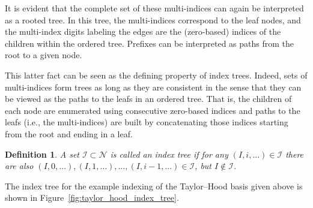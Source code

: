 \documentclass[a4paper,10pt,headings=normal,bibliography=totoc]{scrartcl}
\newtheorem{definition}{Definition}
\begin{document}
It is evident that the complete set of these multi-indices can again be interpreted as a rooted tree.
In this tree, the multi-indices correspond
to the leaf nodes, and the multi-index digits labeling the edges are the
(zero-based) indices of the children within the ordered tree.  Prefixes can be
interpreted as paths from the root to a given node.

This latter fact can be seen as the defining property of index trees.  Indeed,
sets of multi-indices form trees as long as they are consistent in the sense that they
can be viewed as the paths to the leafs in an ordered tree.
That is, the children of each node are enumerated using consecutive zero-based
indices and paths to the leafs (i.e., the multi-indices) are built by concatenating
those indices starting from the root and ending in a leaf.

\begin{definition}
\label{def:index_tree}
 A set $\mathcal{I} \subset \mathcal{N}$ is called an \emph{index tree}
 if for any $(I,i,\dots) \in \mathcal{I}$ there are also $(I,0,\dots),(I,1,\dots),\dots,(I,i-1,\dots) \in \mathcal{I}$,
 but $I \notin \mathcal{I}$.
\end{definition}
The index tree for the example indexing of the Taylor--Hood basis given above is shown
in Figure~\ref{fig:taylor_hood_index_tree}.
\end{document}

